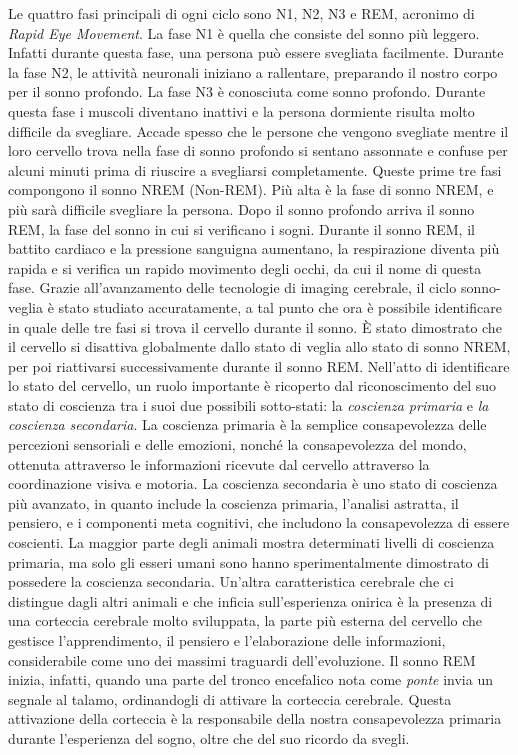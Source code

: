 Le quattro fasi principali di ogni ciclo sono N1, N2, N3 e REM, acronimo di \textit{Rapid Eye Movement}.
La fase N1 è quella che consiste del sonno più leggero.
Infatti durante questa fase, una persona può essere svegliata facilmente.
Durante la fase N2, le attività neuronali iniziano a rallentare, preparando il nostro corpo per il sonno
profondo.
La fase N3 è conosciuta come sonno profondo.
Durante questa fase i muscoli diventano inattivi e la persona dormiente risulta molto difficile da svegliare.
Accade spesso che le persone che vengono svegliate mentre il loro cervello trova nella fase di sonno profondo
si sentano assonnate e confuse per alcuni minuti prima di riuscire a svegliarsi completamente.
Queste prime tre fasi compongono il sonno NREM (Non-REM).
Più alta è la fase di sonno NREM, e più sarà difficile svegliare la persona.
Dopo il sonno profondo arriva il sonno REM, la fase del sonno in cui si verificano i sogni.
Durante il sonno REM, il battito cardiaco e la pressione sanguigna aumentano, la respirazione diventa più rapida e
si verifica un rapido movimento degli occhi, da cui il nome di questa fase.
Grazie all'avanzamento delle tecnologie di imaging cerebrale, il ciclo sonno-veglia è stato studiato accuratamente,
a tal punto che ora è possibile identificare in quale delle tre fasi si trova il cervello durante il sonno.
\`E stato dimostrato che il cervello si disattiva globalmente dallo stato di veglia allo stato di sonno NREM,
per poi riattivarsi successivamente durante il sonno REM.
Nell'atto di identificare lo stato del cervello, un ruolo importante è ricoperto dal riconoscimento del suo stato
di coscienza tra i suoi due possibili sotto-stati: la \textit{coscienza primaria} e \textit{la coscienza secondaria}.
La coscienza primaria è la semplice consapevolezza delle percezioni sensoriali e delle emozioni, nonché la consapevolezza
del mondo, ottenuta attraverso le informazioni ricevute dal cervello attraverso la coordinazione visiva e motoria.
La coscienza secondaria è uno stato di coscienza più avanzato, in quanto include la coscienza primaria,
l'analisi astratta, il pensiero, e i componenti meta cognitivi, che includono la consapevolezza di essere coscienti.
La maggior parte degli animali mostra determinati livelli di coscienza primaria, ma solo gli esseri umani sono
hanno sperimentalmente dimostrato di possedere la coscienza secondaria. %
Un'altra caratteristica cerebrale che ci distingue dagli altri animali e che inficia sull'esperienza
onirica è la presenza di una corteccia cerebrale molto sviluppata, la parte più esterna del cervello che
gestisce l'apprendimento, il pensiero e l'elaborazione delle informazioni, considerabile come uno dei massimi
traguardi dell'evoluzione.
Il sonno REM inizia, infatti, quando una parte del tronco encefalico nota come \textit{ponte} invia un segnale al
talamo, ordinandogli di attivare la corteccia cerebrale.
Questa attivazione della corteccia è la responsabile della nostra consapevolezza primaria durante l'esperienza del
sogno, oltre che del suo ricordo da svegli. \newline


